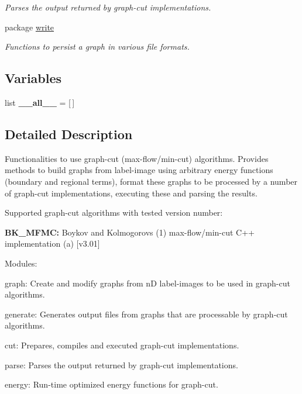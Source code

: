 \begin{DoxyCompactItemize}
\begin{DoxyCompactList}\small\item\em Parses the output returned by graph-\/cut implementations. \end{DoxyCompactList}

\item 
package \hyperlink{namespacemedpy_1_1graphcut_1_1write}{write}


\begin{DoxyCompactList}\small\item\em Functions to persist a graph in various file formats. \end{DoxyCompactList}

\end{DoxyCompactItemize}
\subsection*{Variables}
\begin{DoxyCompactItemize}
\item 
\hypertarget{namespacemedpy_1_1graphcut_aad412f9af7e17894cc03632be5905a54}{
list {\bfseries \_\-\_\-all\_\-\_\-} = \mbox{[}$\,$\mbox{]}}
\label{namespacemedpy_1_1graphcut_aad412f9af7e17894cc03632be5905a54}

\end{DoxyCompactItemize}


\subsection{Detailed Description}
Functionalities to use graph-\/cut (max-\/flow/min-\/cut) algorithms. Provides methods to build graphs from label-\/image using arbitrary energy functions (boundary and regional terms), format these graphs to be processed by a number of graph-\/cut implementations, executing these and parsing the results.

Supported graph-\/cut algorithms with tested version number:\par

\begin{DoxyItemize}
\item {\bfseries BK\_\-MFMC:} Boykov and Kolmogorovs (1) max-\/flow/min-\/cut C++ implementation (a) \mbox{[}v3.01\mbox{]}
\end{DoxyItemize}

Modules:
\begin{DoxyItemize}
\item graph: Create and modify graphs from nD label-\/images to be used in graph-\/cut algorithms.
\item generate: Generates output files from graphs that are processable by graph-\/cut algorithms.
\item cut: Prepares, compiles and executed graph-\/cut implementations.
\item parse: Parses the output returned by graph-\/cut implementations.
\item energy: Run-\/time optimized energy functions for graph-\/cut.
\end{DoxyItemize}

